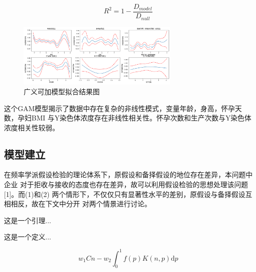 \documentclass[withoutpreface,notoc]{cumcmthesis}
\begin{document}
	
\begin{equation*}  
    R^{2}=1-\dfrac{D_{model}}{D_{null}}
\end{equation*}






	\begin{figure}[ht]
		\centering
		\includegraphics[width=0.7\textwidth]{figures/广义可加结果.png} 
		\caption{广义可加模型拟合结果图}
		\label{广义可加结果}
	\end{figure}

	这个GAM模型揭示了数据中存在复杂的非线性模式，变量年龄，身高，怀孕天数，孕妇BMI
	与Y染色体浓度存在非线性相关性。怀孕次数和生产次数与Y染色体浓度相关性较弱。













	\subsection{模型建立}
	在频率学派假设检验的理论体系下，原假设和备择假设的地位存在差异，本问题中企业
对于拒收与接收的态度也存在差异，故可以利用假设检验的思想处理该问题[1]。而(1)和(2)
两个情形下，不仅仅只有显著性水平的差别，原假设与备择假设互相相反，故在下文中分开
对两个情景进行讨论。
	\begin{lemma}
		这是一个引理...
	\end{lemma}
	\begin{definition}
		这是一个定义...
	\end{definition}
	






	\begin{equation*}
		w_{1}Cn - w_{2}\int_{0}^{1} f(p) K(n, p)  \mathrm{d}p
	\end{equation*}
	

	
	
\end{document}
